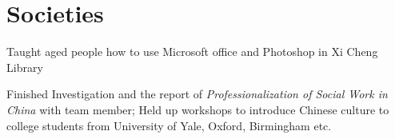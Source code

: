 \documentclass[letterpaper]{deedy-resume} %
\begin{document}
\begin{minipage}[t]{0.66\textwidth}
\sectionspace %


\section{Societies} 


Taught aged people how to use Microsoft office and Photoshop in Xi Cheng Library


Finished Investigation and the report of \emph{Professionalization of Social Work in China} with team member; Held up workshops to introduce Chinese culture to college students from University of Yale, Oxford, Birmingham etc.

\sectionspace %


\end{minipage} %








\end{document}

